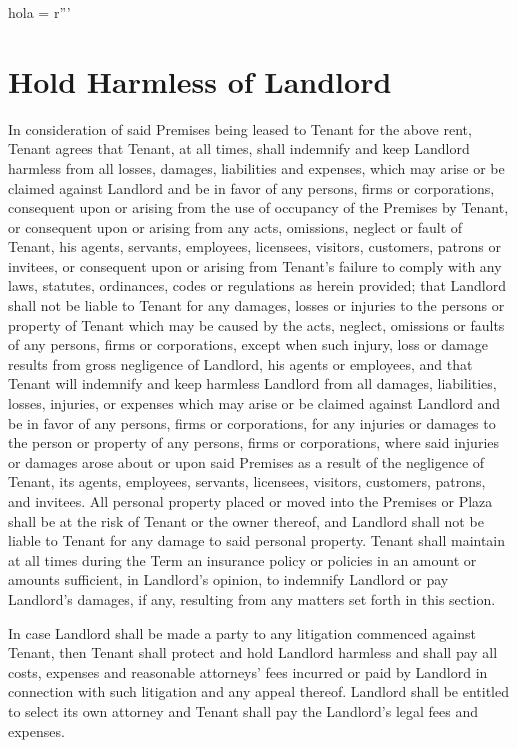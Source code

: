 hola = r'''\documentclass{article}
\begin{document}
\section{Hold Harmless of Landlord}
    In consideration of said Premises being leased to Tenant for the above rent, Tenant agrees that Tenant, at all times, shall indemnify and keep Landlord harmless from all losses, damages, liabilities and expenses, which may arise or be claimed against Landlord and be in favor of any persons, firms or corporations, consequent upon or arising from the use of occupancy of the Premises by Tenant, or consequent upon or arising from any acts, omissions, neglect or fault of Tenant, his agents, servants, employees, licensees, visitors, customers, patrons or invitees, or consequent upon or arising from Tenant's failure to comply with any laws, statutes, ordinances, codes or regulations as herein provided; that Landlord shall not be liable to Tenant for any damages, losses or injuries to the persons or property of Tenant which may be caused by the acts, neglect, omissions or faults of any persons, firms or corporations, except when such injury, loss or damage results from gross negligence of Landlord, his agents or employees, and that Tenant will indemnify and keep harmless Landlord from all damages, liabilities, losses, injuries, or expenses which may arise or be claimed against Landlord and be in favor of any persons, firms or corporations, for any injuries or damages to the person or property of any persons, firms or corporations, where said injuries or damages arose about or upon said Premises as a result of the negligence of Tenant, its agents, employees, servants, licensees, visitors, customers, patrons, and invitees. All personal property placed or moved into the Premises or Plaza shall be at the risk of Tenant or the owner thereof, and Landlord shall not be liable to Tenant for any damage to said personal property. Tenant shall maintain at all times during the Term an insurance policy or policies in an amount or amounts sufficient, in Landlord's opinion, to indemnify Landlord or pay Landlord's damages, if any, resulting from any matters set forth in this section.

    In case Landlord shall be made a party to any litigation commenced against Tenant, then Tenant shall protect and hold Landlord harmless and shall pay all costs, expenses and reasonable attorneys' fees incurred or paid by Landlord in connection with such litigation and any appeal thereof.  Landlord shall be entitled to select its own attorney and Tenant shall pay the Landlord’s legal fees and expenses.
\end{document}
